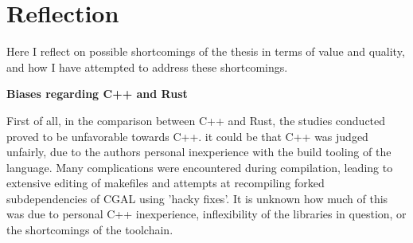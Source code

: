 





  

\section{Reflection}
\label{sec:reflection}

Here I reflect on possible shortcomings of the thesis in terms of value and quality, and how I have attempted to address these shortcomings. 

\textbf{Biases regarding C++ and Rust}

First of all, in the comparison between C++ and Rust, the studies conducted proved to be unfavorable towards C++. 
it could be that C++ was judged unfairly, due to the authors personal inexperience with the build tooling of the language. 
Many complications were encountered during compilation, leading to extensive editing of makefiles and attempts at recompiling forked subdependencies of CGAL using 'hacky fixes'.  
It is unknown how much of this was due to personal C++ inexperience, inflexibility of the libraries in question, or the shortcomings of the toolchain. 

